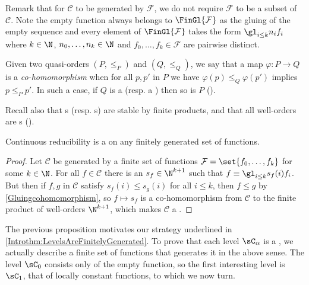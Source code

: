 Remark that for $\mathcal{C}$ to be generated by $\mathcal{F}$, we do not require $\mathcal{F}$ to be a subset of $\mathcal{C}$. 
Note the empty function always belongs to $\FinGl{\mathcal{F}}$ as the gluing of the empty sequence and every element of $\FinGl{\mathcal{F}}$ takes the form $\gl_{i\leq k} n_i f_i$ where $k\in\N$, $n_0,\ldots,n_k\in \N$ and $f_0,\ldots,f_k\in \mathcal{F}$ are pairwise distinct. 

Given two quasi-orders $(P,\leq_P)$ and $(Q,\leq_Q)$, we say that a map $\varphi:P\to Q$ is a \emph{co-homomorphism} when for all $p,p'$ in $P$ we have
$\varphi(p)\leq_Q\varphi(p')$ implies $p\leq_P p'$. In such a case, if $Q$ is a \wqo{} (resp. a \bqo{}) then so is $P$ (\cite[Lemma 3.10]{wellbetterinbetween}).

Recall also that \wqo{}s (resp. \bqo{}s) are stable by finite products, and that all well-orders are \bqo{}s (\cite[Example 3.9 and Proposition 3.14]{wellbetterinbetween}).

\begin{proposition}\label{SecondstepforBQOthm}
Continuous reducibility is a \bqo{} on any finitely generated set of functions.
\end{proposition}

\begin{proof}%
Let $\mathcal{C}$ be generated by a finite set of functions $\mathcal{F}=\set{f_0,\ldots, f_k}$ for some $k\in\N$.
For all $f\in\mathcal{C}$ there is an $s_f\in\N^{k+1}$ such that $f\equiv \gl_{i\leq k}s_f(i)f_i$.
But then if $f,g$ in $\mathcal{C}$ satisfy $s_f(i)\leq s_g(i)$ for all $i\leq k$, then $f\leq g$ by \cref{Gluingcohomomorphism},
so $f\mapsto s_f$ is a co-homomorphism from $\mathcal{C}$
to the finite product of well-orders $\N^{k+1}$, which makes $\mathcal{C}$ a \bqo{}.
\end{proof}


The previous proposition motivates our strategy underlined in \cref{Introthm:LevelsAreFinitelyGenerated}.
To prove that each level $\sC_\alpha$ is a \bqo{}, we actually describe a finite set of functions that generates it in the above sense.
The level $\sC_0$ consists only of the empty function, so
the first interesting level is $\sC_1$, that of locally constant functions, to which we now turn.

